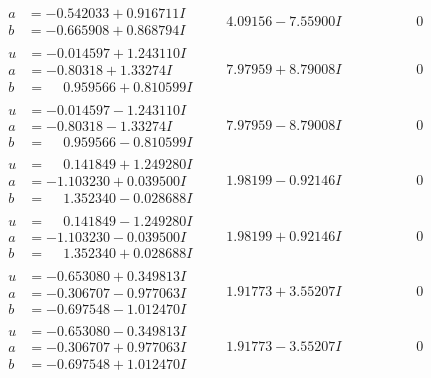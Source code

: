 \documentclass[1p]{elsarticle_modified}
\theoremstyle{definition}
\begin{document}
$$\begin{array}{c|c|c}
\begin{aligned}
a &= -0.542033 + 0.916711 I \\
b &= -0.665908 + 0.868794 I\end{aligned}
 & \phantom{-}4.09156 - 7.55900 I & \phantom{-0.000000 } 0 \\ \hline\begin{aligned}
u &= -0.014597 + 1.243110 I \\
a &= -0.80318 + 1.33274 I \\
b &= \phantom{-}0.959566 + 0.810599 I\end{aligned}
 & \phantom{-}7.97959 + 8.79008 I & \phantom{-0.000000 } 0 \\ \hline\begin{aligned}
u &= -0.014597 - 1.243110 I \\
a &= -0.80318 - 1.33274 I \\
b &= \phantom{-}0.959566 - 0.810599 I\end{aligned}
 & \phantom{-}7.97959 - 8.79008 I & \phantom{-0.000000 } 0 \\ \hline\begin{aligned}
u &= \phantom{-}0.141849 + 1.249280 I \\
a &= -1.103230 + 0.039500 I \\
b &= \phantom{-}1.352340 - 0.028688 I\end{aligned}
 & \phantom{-}1.98199 - 0.92146 I & \phantom{-0.000000 } 0 \\ \hline\begin{aligned}
u &= \phantom{-}0.141849 - 1.249280 I \\
a &= -1.103230 - 0.039500 I \\
b &= \phantom{-}1.352340 + 0.028688 I\end{aligned}
 & \phantom{-}1.98199 + 0.92146 I & \phantom{-0.000000 } 0 \\ \hline\begin{aligned}
u &= -0.653080 + 0.349813 I \\
a &= -0.306707 - 0.977063 I \\
b &= -0.697548 - 1.012470 I\end{aligned}
 & \phantom{-}1.91773 + 3.55207 I & \phantom{-0.000000 } 0 \\ \hline\begin{aligned}
u &= -0.653080 - 0.349813 I \\
a &= -0.306707 + 0.977063 I \\
b &= -0.697548 + 1.012470 I\end{aligned}
 & \phantom{-}1.91773 - 3.55207 I & \phantom{-0.000000 } 0 \\ \hline\begin{aligned}

\end{aligned}
\end{array}$$
\end{document}
